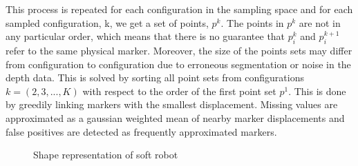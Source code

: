 \documentclass[letterpaper, 10 pt, conference]{ieeeconf}  %
\begin{document}
This process is repeated for each configuration in the sampling space and for each sampled configuration, k, we get a set of points, $p^k$. The points in $p^k$ are not in any particular order, which means that there is no guarantee that $p_i^k$ and $p_i^{k+1}$ refer to the same physical marker. Moreover, the size of the points sets may differ from configuration to configuration due to erroneous segmentation or noise in the depth data. This is solved by sorting all point sets from configurations $k=(2,3,...,K)$ with respect to the order of the first point set $p^1$. This is done by greedily linking markers with the smallest displacement. Missing values are approximated as a gaussian weighted mean of nearby marker displacements and false positives are detected as frequently approximated markers. 

\begin{figure}[htpb]
      \centering
        \caption{Shape representation of soft robot}
        \label{fig:shape}
\end{figure}
\end{document}
